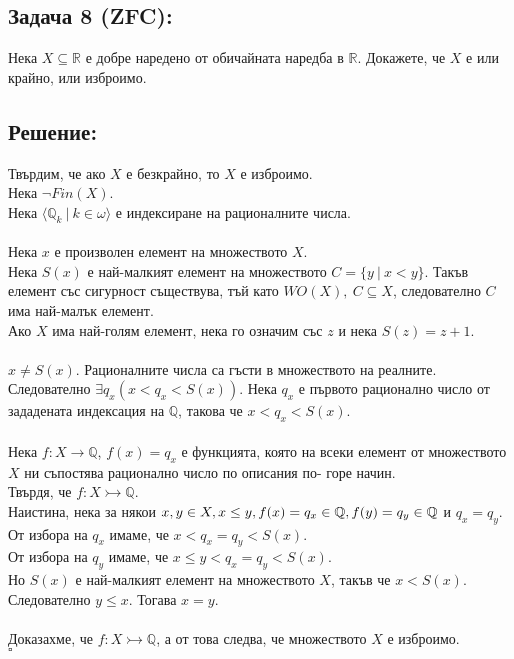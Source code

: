 \documentclass[french]{article}
\begin{document}
	\subsection*{Задача 8 (ZFC):}
	Нека $X \subseteq \mathbb{R}$ е добре наредено от обичайната наредба
	в $\mathbb{R}$. Докажете, че $X$ е или крайно, или изброимо.
	
	\subsection*{Решение:}
	Твърдим, че ако $X$ е безкрайно, то $X$ е изброимо. \\
	Нека $\neg Fin(X)$. \\
	Нека $\langle \mathbb{Q}_k\ |\ k \in \omega \rangle$ е индексиране на рационалните числа. \\
	\\
	Нека $x$ е произволен елемент на множеството $X$. \\
	Нека $S(x)$ е най-малкият елемент на множеството $C = \{y\ |\ x < y\}$. Такъв елемент със сигурност съществува, тъй като $WO(X),\ C \subseteq X$, следователно $C$ има най-малък елемент. \\
	Ако $X$ има най-голям елемент, нека го означим със $z$ и нека $S(z) = z + 1$. \\
	\\
	$x \not= S(x)$. Рационалните числа са гъсти в множеството на реалните. Следователно $\exists q_x (x < q_x < S(x))$. Нека $q_x$ е първото рационално число от зададената индексация на $\mathbb{Q}$, такова че $x < q_x < S(x)$. \\
	\\
	Нека $f : X \to \mathbb{Q}$, $f(x) = q_x$ е функцията, която на всеки елемент от множеството $X$ ни съпостява рационално число по описания по- горе начин. \\
	Твърдя, че $f : X \rightarrowtail \mathbb{Q}$. \\
	Наистина, нека за някои $x, y \in X, x \le y, \\
	f(x) = q_x \in \mathbb{Q}, f(y) = q_y \in \mathbb{Q}$ и $q_x = q_y$. \\
	От избора на $q_x$ имаме, че $x < q_x = q_y < S(x)$. \\
	От избора на $q_y$ имаме, че $x \le y < q_x = q_y < S(x)$. \\
	Но $S(x)$ е най-малкият елемент на множеството $X$, такъв че $x < S(x)$. Следователно $y \le x$. Тогава $x = y$. \\
	\\
	Доказахме, че $f : X \rightarrowtail \mathbb{Q}$, а от това следва, че множеството $X$ е изброимо. \\
	$\square$
	
\end{document}
